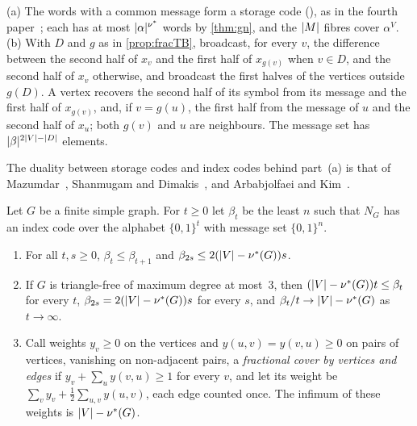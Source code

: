 \begin{outline}
(a) The words with a common message form a storage code (), as in the fourth
paper~\cite[Remark~4.9(b)]{FourthPaper2026}; each has at most $\lvert \alpha \rvert^{\nu^{*}}$ words by \cref{thm:gn}, and the
$\lvert M \rvert$ fibres cover $\alpha^V$. (b) With $D$ and $g$ as in \cref{prop:fracTB}, broadcast, for every $v$, the
difference between the second half of $x_v$ and the first half of $x_{g(v)}$ when $v\in D$, and the second half of $x_v$
otherwise, and broadcast the first halves of the vertices outside $g(D)$. A vertex recovers the second half of its symbol
from its message and the first half of $x_{g(v)}$, and, if $v=g(u)$, the first half from the message of $u$ and the second
half of $x_u$; both $g(v)$ and $u$ are neighbours. The message set has $\lvert \beta \rvert^{2\lvert V \rvert-\lvert D \rvert}$ elements.
\end{outline}

The duality between storage codes and index codes behind part~(a) is that of Mazumdar~\cite{Mazumdar2014}, Shanmugam and
Dimakis~\cite{ShanmugamDimakis2014}, and Arbabjolfaei and Kim~\cite{ArbabjolfaeiKim2015}.

\begin{corollary}\label{cor:broadcast}
Let $G$ be a finite simple graph. For $t\ge0$ let $\beta_t$ be the least $n$ such that $N_G$ has an index code over the
alphabet $\{0,1\}^t$ with message set $\{0,1\}^n$.
\begin{enumerate}[label=(\alph*)]
\item\label{it:bc-every} For all $t,s\ge0$, $\beta_t\le\beta_{t+1}$ and $\beta_{2s}\le2(\lvert V \rvert-\nu^{*}(G))s$.
\item\label{it:bc-rate} If $G$ is triangle-free of maximum degree at most~$3$, then $(\lvert V \rvert-\nu^{*}(G))t\le\beta_t$ for
every $t$, $\beta_{2s}=2(\lvert V \rvert-\nu^{*}(G))s$ for every $s$, and $\beta_t/t\to\lvert V \rvert-\nu^{*}(G)$ as $t\to\infty$.
\item\label{it:bc-cover} Call weights $y_v\ge0$ on the vertices and $y(u,v)=y(v,u)\ge0$ on pairs of vertices, vanishing on
non-adjacent pairs, a \emph{fractional cover by vertices and edges} if $y_v+\sum_uy(v,u)\ge1$ for every $v$, and let its
weight be $\sum_vy_v+\frac12\sum_{u,v}y(u,v)$, each edge counted once. The infimum of these weights is
$\lvert V \rvert-\nu^{*}(G)$.
\end{enumerate}
\end{corollary}

